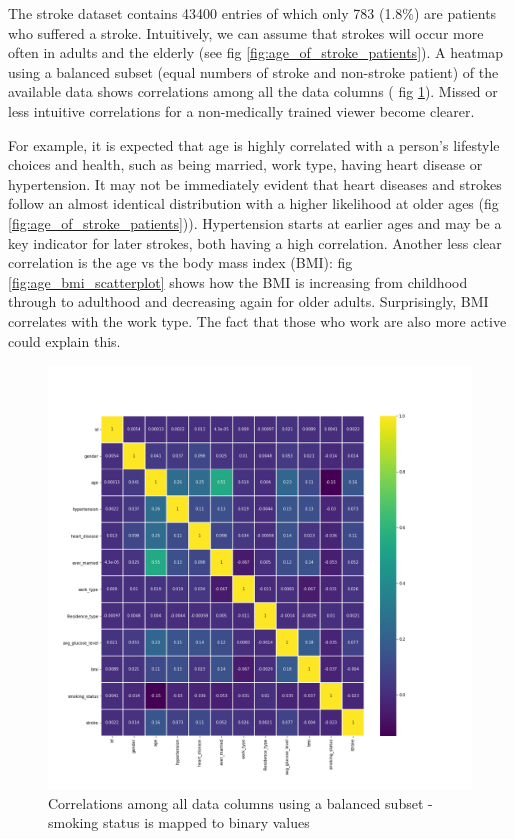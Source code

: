 \documentclass[proposal]{softeng}
\begin{document}
The stroke dataset contains 43400 entries of which only 783 (1.8\%) are patients who suffered a stroke. Intuitively, we can assume that strokes will occur more often in adults and the elderly (see fig \ref{fig:age_of_stroke_patients}). A heatmap using a balanced subset (equal numbers of stroke and non-stroke patient) of the available data shows correlations among all the data columns ( fig \ref{fig:heatmap}). Missed or less intuitive correlations for a non-medically trained viewer become clearer.

For example, it is expected that age is highly correlated with a person's lifestyle choices and health, such as being married, work type, having heart disease or hypertension. It may not be immediately evident that heart diseases and strokes follow an almost identical distribution with a higher likelihood at older ages (fig \ref{fig:age_of_stroke_patients})). Hypertension starts at earlier ages and may be a key indicator for later strokes, both having a high correlation. Another less clear correlation is the age vs the body mass index (BMI): fig \ref{fig:age_bmi_scatterplot} shows how the BMI is increasing from childhood through to adulthood and decreasing again for older adults. Surprisingly, BMI correlates with the work type. The fact that those who work are also more active could explain this.

\begin{figure}[h!]
\centering

\includegraphics[width=.73\textwidth]{images/building_ann/heatmap.png}

\caption{Correlations among all data columns using a balanced subset - smoking status is mapped to binary values}

\label{fig:heatmap}
\end{figure}
\end{document}
